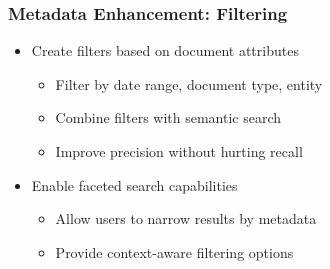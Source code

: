 \begin{frame}
    \frametitle{Metadata Enhancement: Filtering}
    \begin{itemize}
        \item Create filters based on document attributes
        \begin{itemize}
            \item Filter by date range, document type, entity
            \item Combine filters with semantic search
            \item Improve precision without hurting recall
        \end{itemize}
        \item Enable faceted search capabilities
        \begin{itemize}
            \item Allow users to narrow results by metadata
            \item Provide context-aware filtering options
        \end{itemize}
    \end{itemize}
    
    \begin{center}
    \end{center}
\end{frame}

